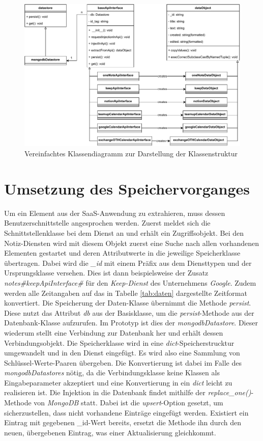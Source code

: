 \begin{figure}[H]
	\centering
	\includegraphics[width=1\textwidth]{Bilder/umsetzung/classDiagramm.pdf}
	\caption{Vereinfachtes Klassendiagramm zur Darstellung der Klassenstruktur}
	\label{fig:Klassendiagram}
\end{figure}

\section{Umsetzung des Speichervorganges}

Um ein Element aus der SaaS-Anwendung zu extrahieren, muss dessen Benutzerschnittstelle angesprochen werden. Zuerst meldet sich die Schnittstellenklasse bei dem Dienst an und erhält ein Zugriffsobjekt. Bei den Notiz-Diensten wird mit diesem Objekt zuerst eine Suche nach allen vorhandenen Elementen gestartet und deren Attributwerte in die jeweilige Speicherklasse übertragen. Dabei wird die \textit{\_id} mit einem Präfix aus dem Diensttypen und der Ursprungsklasse versehen. Dies ist dann beispielsweise der Zusatz \textit{notes\#keepApiInterface\#} für den \textit{Keep-Dienst} des Unternehmens \textit{Google}. Zudem werden alle Zeitangaben auf das in Tabelle \ref{tab:daten} dargestellte Zeitformat konvertiert. Die Speicherung der Daten-Klasse übernimmt die Methode \textit{persist}. Diese nutzt das Attribut \textit{db} aus der Basisklasse, um die \textit{persist}-Methode aus der Datenbank-Klasse aufzurufen. Im Prototyp ist dies der \textit{mongodbDatastore}. Dieser wiederum stellt eine Verbindung zur Datenbank her und erhält dessen Verbindungsobjekt. Die Speicherklasse wird in eine \textit{dict}-Speicherstrucktur umgewandelt und in den Dienst eingefügt. Es wird also eine Sammlung von Schlüssel-Werte-Paaren übergeben. Die Konvertierung ist dabei im Falle des \textit{mongodbDatastores} nötig, da die Verbindungsklasse keine Klassen als Eingabeparameter akzeptiert und eine Konvertierung in ein \textit{dict} leicht zu realisieren ist. Die Injektion in die Datenbank findet mithilfe der \textit{replace\_one()}-Methode von \textit{MongoDB} statt. Dabei ist die \textit{upsert}-Option gesetzt, um sicherzustellen, dass nicht vorhandene Einträge eingefügt werden. Existiert ein Eintrag mit gegebenen \_id-Wert bereits, ersetzt die Methode ihn durch den neuen, übergebenen Eintrag, was einer Aktualisierung gleichkommt.

